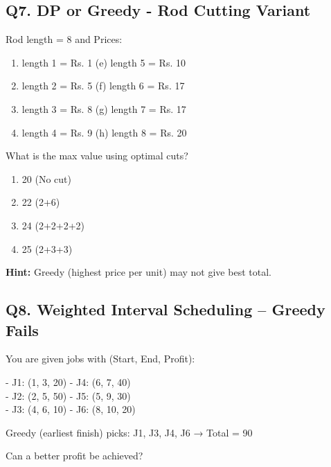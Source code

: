 \subsection*{Q7. DP or Greedy - Rod Cutting Variant}
Rod length = 8 and Prices: 

\begin{enumerate}[label=(\alph*)]
    \item length 1 = Rs. 1 \hspace{2.5cm} (e) length 5 = Rs. 10 
    \item length 2 = Rs. 5 \hspace{2.5cm} (f) length 6 = Rs. 17 
    \item length 3 = Rs. 8 \hspace{2.5cm} (g) length 7 = Rs. 17 
    \item length 4 = Rs. 9 \hspace{2.5cm} (h) length 8 = Rs. 20
\end{enumerate}


What is the max value using optimal cuts?

\begin{enumerate}[label=(\alph*)]
    \item 20 \quad (No cut) 
    \item 22 \quad (2+6) 
    \item 24 \quad (2+2+2+2) 
    \item 25 \quad (2+3+3)
\end{enumerate}

\textbf{Hint:} Greedy (highest price per unit) may not give best total.


\subsection*{Q8. Weighted Interval Scheduling – Greedy Fails}
You are given jobs with (Start, End, Profit):

\begin{center}
- J1: (1, 3, 20)  \hspace{1.5cm} - J4: (6, 7, 40) \\
- J2: (2, 5, 50)  \hspace{1.5cm} - J5: (5, 9, 30) \\
- J3: (4, 6, 10)  \hspace{1.5cm} - J6: (8, 10, 20)
\end{center}

Greedy (earliest finish) picks: J1, J3, J4, J6 → Total = 90

Can a better profit be achieved?

